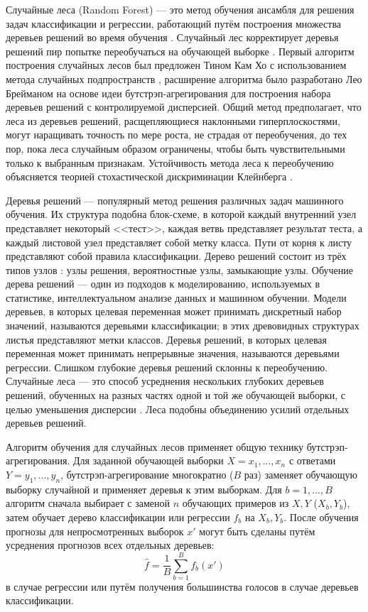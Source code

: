 Случайные леса (Random Forest) --- это метод обучения ансамбля для решения задач классификации и регрессии, работающий путём построения множества деревьев решений во время обучения \autocite{TinKamHo1998}. Случайный лес корректирует деревья решений пир попытке переобучаться на обучающей выборке \autocite{hastie2001elements}. Первый алгоритм построения случайных лесов был предложен Тином Кам Хо с использованием метода случайных подпространств \autocite{TinKamHo1998}, расширение алгоритма было разработано Лео Брейманом \autocite{Breiman2001} на основе идеи бутстрэп-агрегирования для построения набора деревьев решений с контролируемой дисперсией. Общий метод предполагает, что леса из деревьев решений, расщепляющиеся наклонными гиперплоскостями, могут наращивать точность по мере роста, не страдая от переобучения, до тех пор, пока леса случайным образом ограничены, чтобы быть чувствительными только к выбранным признакам. Устойчивость метода леса к переобучению объясняется теорией стохастической дискриминации Клейнберга \autocite{Kleinberg1990, Kleinberg2000}. 

Деревья решений --- популярный метод решения различных задач машинного обучения. Их структура подобна блок-схеме, в которой каждый внутренний узел представляет некоторый <<тест>>, каждая ветвь представляет результат теста, а каждый листовой узел представляет собой метку класса. Пути от корня к листу представляют собой правила классификации. Дерево решений состоит из трёх типов узлов \autocite{Kamiski2017}: узлы решения, вероятностные узлы, замыкающие узлы. Обучение дерева решений --- один из подходов к моделированию, используемых в статистике, интеллектуальном анализе данных и машинном обучении. Модели деревьев, в которых целевая переменная может принимать дискретный набор значений, называются деревьями классификации; в этих древовидных структурах листья представляют метки классов. Деревья решений, в которых целевая переменная может принимать непрерывные значения, называются деревьями регрессии. Слишком глубокие деревья решений склонны к переобучению. Случайные леса --- это способ усреднения нескольких глубоких деревьев решений, обученных на разных частях одной и той же обучающей выборки, с целью уменьшения дисперсии \autocite{hastie2001elements}. Леса подобны объединению усилий отдельных деревьев решений.

Алгоритм обучения для случайных лесов применяет общую технику бутстрэп-агрегирования. Для заданной обучающей выборки $X = x_1, ..., x_n$ с ответами $Y = y_1, ..., y_n$, бутстрэп-агрегирование многократно ($B$ раз) заменяет обучающую выборку случайной и применяет деревья к этим выборкам. Для $b = 1, ..., B$ алгоритм сначала выбирает с заменой $n$ обучающих примеров из $X, Y$ ($X_b, Y_b$), затем обучает дерево классификации или регрессии $f_b$ на $X_b, Y_b$. После обучения прогнозы для непросмотренных выборок $x'$ могут быть сделаны путём усреднения прогнозов всех отдельных деревьев:
\begin{equation}
\label{eq:rf_bagging}
\hat{f} = {\frac{1}{B}} \sum_{b = 1}^{B} f_{b} (x')
\end{equation}
в случае регрессии или путём получения большинства голосов в случае деревьев классификации.

